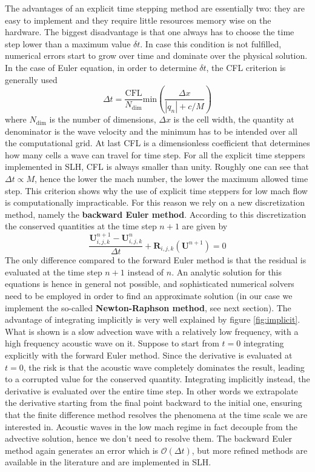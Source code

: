 The advantages of an explicit time stepping method are essentially two: they are easy to implement and they require little resources memory wise on the hardware. The biggest disadvantage is that one always has to choose the time step lower than a maximum value $\delta t$. In case this condition is not fulfilled, numerical errors start to grow over time and dominate over the physical solution. In the case of Euler equation, in order to determine $\delta t$, the CFL criterion is generally used
\begin{equation}\label{eq:cfl}
	\Delta t = \frac{\mathrm{CFL}}{N_{\mathrm{dim}}}\mathrm{min} \left(  \frac{\Delta x}{|q_n| + c/M}   \right)
\end{equation}
where $N_{\mathrm{dim}}$ is the number of dimensions, $\Delta x$ is the cell width, the quantity at denominator is the wave velocity and the minimum has to be intended over all the computational grid. At last CFL is a dimensionless coefficient that determines how many cells a wave can travel for time step. For all the explicit time steppers implemented in SLH, CFL is always smaller than unity. Roughly one can see that $\Delta t \propto M$, hence the lower the mach number, the lower the maximum allowed time step. This criterion shows why the use of explicit time steppers for low mach flow is computationally impracticable.
For this reason we rely on a new discretization method, namely the \textbf{backward Euler method}. According to this discretization the conserved quantities at the time step $n+1$ are given by
\begin{equation}\label{eq:backward}
	\frac{\mathbf{U}^{n+1}_{i, j, k} - \mathbf{U}^{n}_{i, j, k}}{\Delta t} + \mathbf{R}_{i, j, k}(\mathbf{U}^{n+1})=0
\end{equation}
The only difference compared to the forward Euler method is that the residual is evaluated at the time step $n+1$ instead of $n$. An analytic solution for this equations is hence in general not possible, and sophisticated numerical solvers need to be employed in order to find an approximate solution (in our case we implement the so-called \textbf{Newton-Raphson method}, see next section). The advantage of integrating implicitly is very well explained by figure \ref{fig:implicit}. What is shown is a slow advection wave with a relatively low frequency, with a high frequency acoustic wave on it. Suppose to start from $t=0$ integrating explicitly with the forward Euler method. Since the derivative is evaluated at $t=0$, the risk is that the acoustic wave completely dominates the result, leading to a corrupted value for the conserved quantity. Integrating implicitly instead, the derivative is evaluated over the entire time step. In other words we extrapolate the derivative starting from the final point backward to the initial one, ensuring that the finite difference method resolves the phenomena at the time scale we are interested in. Acoustic waves in the low mach regime in fact decouple from the advective solution, hence we don't need to resolve them. The backward Euler method again generates an error which is $\mathcal{O}(\Delta t)$, but more refined methods are available in the literature and are implemented in SLH. 

